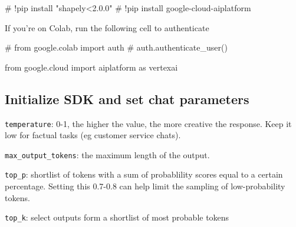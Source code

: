 \documentclass[
  letterpaper,
  DIV=11,
  numbers=noendperiod]{scrreprt}
\newenvironment{Shaded}{\begin{snugshade}}{\end{snugshade}}
\newcommand{\CommentTok}[1]{\textcolor[rgb]{0.37,0.37,0.37}{#1}}
\newcommand{\ImportTok}[1]{\textcolor[rgb]{0.00,0.46,0.62}{#1}}
\newcommand{\NormalTok}[1]{\textcolor[rgb]{0.00,0.23,0.31}{#1}}
\begin{document}
\begin{Shaded}
\begin{Highlighting}[]
\CommentTok{\# !pip install "shapely\textless{}2.0.0"}
\CommentTok{\# !pip install google{-}cloud{-}aiplatform}
\end{Highlighting}
\end{Shaded}

If you're on Colab, run the following cell to authenticate

\begin{Shaded}
\begin{Highlighting}[]
\CommentTok{\# from google.colab import auth}
\CommentTok{\# auth.authenticate\_user()}
\end{Highlighting}
\end{Shaded}

\begin{Shaded}
\begin{Highlighting}[]
\ImportTok{from}\NormalTok{ google.cloud }\ImportTok{import}\NormalTok{ aiplatform }\ImportTok{as}\NormalTok{ vertexai}
\end{Highlighting}
\end{Shaded}

\hypertarget{initialize-sdk-and-set-chat-parameters}{%
\subsection{Initialize SDK and set chat
parameters}\label{initialize-sdk-and-set-chat-parameters}}

\texttt{temperature}: 0-1, the higher the value, the more creative the
response. Keep it low for factual tasks (eg customer service chats).

\texttt{max\_output\_tokens}: the maximum length of the output.

\texttt{top\_p}: shortlist of tokens with a sum of probablility scores
equal to a certain percentage. Setting this 0.7-0.8 can help limit the
sampling of low-probability tokens.

\texttt{top\_k}: select outputs form a shortlist of most probable tokens
\end{document}
